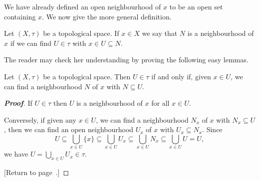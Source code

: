 We have already defined an open neighbourhood of $x$ to be
an open set containing $x$. We now give the more general 
definition.
\begin{definition}\label{D;neighbourhood} 
Let $(X,\tau)$ be a topological space.
If $x\in X$ we say that $N$ is a neighbourhood of $x$
if we can find $U\in\tau$ with $x\in U\subseteq N$.
\end{definition}

The reader may check her understanding by proving
the following easy lemmas.


\begin{lemma}\label{L;open topology via neighbourhood}
Let $(X,\tau)$ be a topological space.
Then $U\in\tau$ if and only if, given $x\in U$,
we can find a neighbourhood $N$ of $x$ 
with $N\subseteq U$.
\end{lemma}
\begin{proof}[\bf Proof]
If $U\in\tau$ then $U$ is a neighbourhood of $x$ for all $x\in U$.

Conversely, if given any $x\in U$, we can find a neighbourhood
$N_{x}$ of $x$ with $N_{x}\subseteq U$, then we can find
an open neighbourhood $U_{x}$ of $x$ with $U_{x}\subseteq N_{x}$.
Since 
\[U\subseteq\bigcup_{x\in U}\{x\}
\subseteq\bigcup_{x\in U}U_{x}
\subseteq\bigcup_{x\in U}N_{x}
\subseteq\bigcup_{x\in U}U=U,\]
we have $U=\bigcup_{x\in U}U_{x}\in\tau$.

[Return to page~\pageref{L;open topology via neighbourhood}.]
\end{proof}



